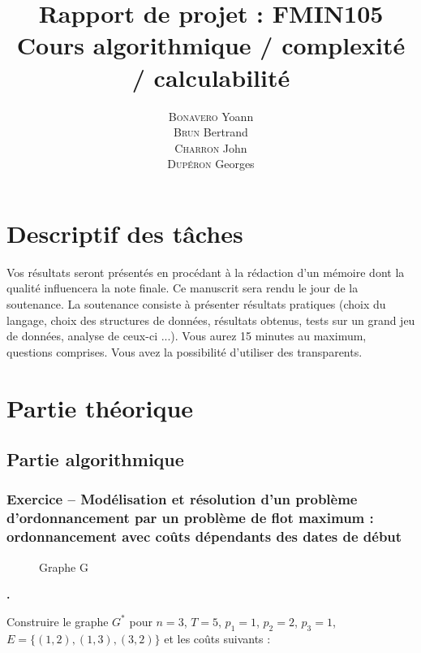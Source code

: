 \documentclass{article}
\title{Rapport de projet : FMIN105\\ Cours algorithmique / complexité / calculabilité}
\author{\textsc{Bonavero} Yoann \\ \textsc{Brun} Bertrand \\ \textsc{Charron} John \\ \textsc{Dupéron} Georges}
\date{}
\newcounter{exocount}
\newcounter{enoncecount}
\newenvironment{enonce}
{
\stepcounter{enoncecount}
\bf\small \arabic{enoncecount}.
\begin{bf}
}
{
\end{bf}
}
\begin{document}

\setcounter{page}{0}
\pagestyle{empty}
\thispagestyle{empty}
\tableofcontents
\pagestyle{empty}
\thispagestyle{empty}
\newpage
\pagestyle{plain}


\section{Descriptif des tâches}
Vos résultats seront présentés en procédant à la rédaction d'un mémoire dont la qualité influencera la note finale. Ce manuscrit sera rendu le jour de la soutenance. La soutenance consiste à présenter résultats pratiques (choix du langage, choix des structures de données, résultats obtenus, tests sur un grand jeu de données, analyse de ceux-ci ...). Vous aurez 15 minutes au maximum, questions comprises. Vous avez la possibilité d'utiliser des transparents.


\section{Partie théorique}
\subsection{Partie algorithmique}

\subsubsection*{Exercice \bf\small {} -- Modélisation et résolution d'un problème d'ordonnancement par un problème de flot maximum : ordonnancement avec coûts dépendants des dates de début}



\begin{figure}[h!]
  \centering
  \caption{Graphe G}
  \label{fig:graphe-g}
\end{figure}

\begin{enonce}
Construire le graphe $G^*$ pour $n = 3$, $T = 5$, $p_1 = 1$, $p_2 = 2$, $p_3 = 1$, 
$E = \{(1,2), (1,3), (3,2)\}$ et les coûts suivants :
\end{enonce}
\end{document}
